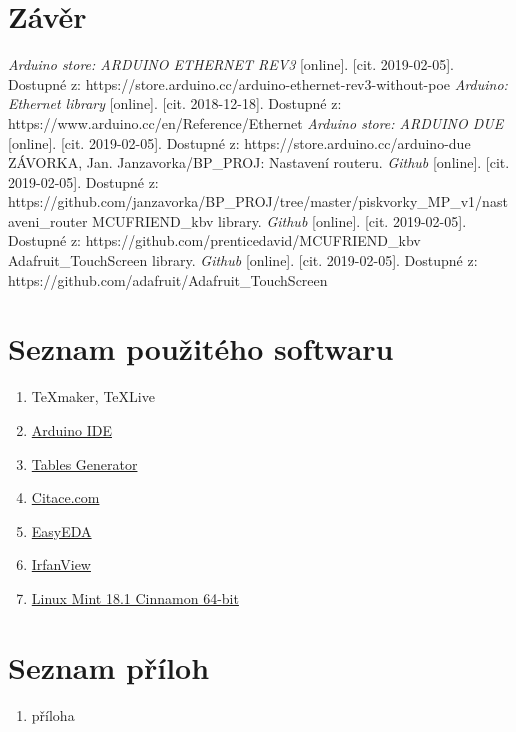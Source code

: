 \documentclass[a4paper,12pt, twoside]{article} %
\begin{document}
\section{Závěr}
%
\clearpage
\renewcommand{\refname}{Seznam použité literatury a zdrojů informací}
\begin{thebibliography}{99}
\textit{Arduino store: ARDUINO ETHERNET REV3} [online]. [cit. 2019-02-05]. Dostupné z: https://store.arduino.cc/arduino-ethernet-rev3-without-poe
\textit{Arduino: Ethernet library} [online]. [cit. 2018-12-18]. Dostupné z: https://www.arduino.cc/en/Reference/Ethernet
\textit{Arduino store: ARDUINO DUE} [online]. [cit. 2019-02-05]. Dostupné z: https://store.arduino.cc/arduino-due
ZÁVORKA, Jan. Janzavorka/BP\_PROJ: Nastavení routeru. \textit{Github} [online]. [cit. 2019-02-05]. Dostupné z: https://github.com/janzavorka/BP\_PROJ/tree/master/piskvorky\_MP\_v1/nastaveni\_router
MCUFRIEND\_kbv library. \textit{Github} [online]. [cit. 2019-02-05]. Dostupné z: https://github.com/prenticedavid/MCUFRIEND\_kbv
Adafruit\_TouchScreen library. \textit{Github} [online]. [cit. 2019-02-05]. Dostupné z: https://github.com/adafruit/Adafruit\_TouchScreen
\end{thebibliography}
\clearpage
{} %
\section*{Seznam použitého softwaru}
\begin{enumerate}%
	\item \TeX maker, \TeX Live
	\item \href{https://www.arduino.cc/en/main/software}{Arduino IDE}
	\item \href{https://www.tablesgenerator.com/latex_tables}{Tables Generator}
	\item \href{https://www.citace.com/citace-pro}{Citace.com}
	\item \href{https://easyeda.com/}{EasyEDA}
	\item \href{https://www.irfanview.com/}{IrfanView}
	\item \href{https://linuxmint.com/}{Linux Mint 18.1 Cinnamon 64-bit}
\end{enumerate}
\section*{Seznam příloh} 
\begin{enumerate}[{Příloha} 1:]
\item příloha
\end{enumerate}
\end{document}
